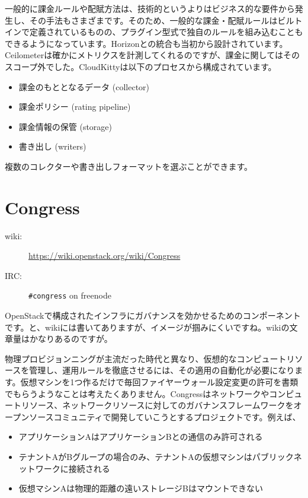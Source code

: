 一般的に課金ルールや配賦方法は、技術的というよりはビジネス的な要件から発生し、その手法もさまざまです。そのため、一般的な課金・配賦ルールはビルトインで定義されているものの、プラグイン型式で独自のルールを組み込むこともできるようになっています。Horizonとの統合も当初から設計されています。Ceilometerは確かにメトリクスを計測してくれるのですが、課金に関してはそのスコープ外でした。CloudKittyは以下のプロセスから構成されています。

\begin{itemize}
	\item 課金のもととなるデータ (collector)
	\item 課金ポリシー (rating pipeline)
	\item 課金情報の保管 (storage)
	\item 書き出し (writers)
\end{itemize}

複数のコレクターや書き出しフォーマットを選ぶことができます。

\section{Congress}

\begin{description}
	\item[wiki:] \url{https://wiki.openstack.org/wiki/Congress}
	\item[IRC:] \verb|#congress| on freenode
\end{description}

OpenStackで構成されたインフラにガバナンスを効かせるためのコンポーネントです。と、wikiには書いてありますが、イメージが掴みにくいですね。wikiの文章量はかなりあるのですが。

物理プロビジョンニングが主流だった時代と異なり、仮想的なコンピュートリソースを管理し、運用ルールを徹底させるには、その適用の自動化が必要になります。仮想マシンを1つ作るだけで毎回ファイヤーウォール設定変更の許可を書類でもらうようなことは考えたくありません。Congressはネットワークやコンピュートリソース、ネットワークリソースに対してのガバナンスフレームワークをオープンソースコミュニティで開発していこうとするプロジェクトです。例えば、

\begin{itemize}
	\item アプリケーションAはアプリケーションBとの通信のみ許可される
	\item テナントAがBグループの場合のみ、テナントAの仮想マシンはパブリックネットワークに接続される
	\item 仮想マシンAは物理的距離の遠いストレージBはマウントできない
\end{itemize}

